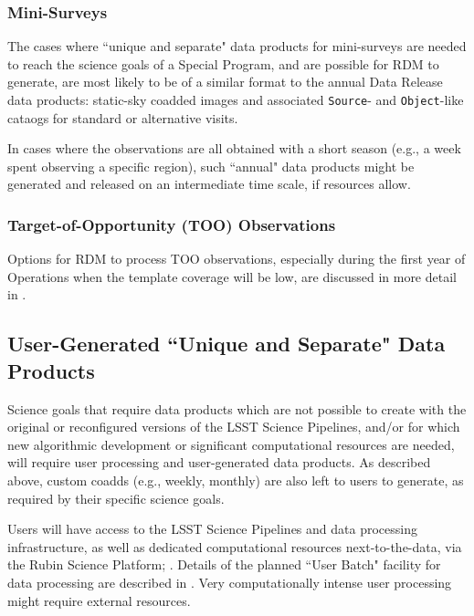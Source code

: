 \subsubsection{Mini-Surveys}

The cases where ``unique and separate" data products for mini-surveys are 
needed to reach the science goals of a Special Program, and are possible for 
RDM to generate, are most likely to be of a similar format to the annual 
Data Release data products: static-sky coadded images and associated 
{\tt Source}- and {\tt Object}-like cataogs for standard or alternative visits.

In cases where the observations are all obtained with a short season 
(e.g., a week spent observing a specific region), such ``annual" 
data products might be generated and released on an intermediate time scale, 
if resources allow.


\subsubsection{Target-of-Opportunity (TOO) Observations}

Options for RDM to process TOO observations, especially during the first year of Operations 
when the template coverage will be low, are discussed in more detail in 
.


\subsection{User-Generated ``Unique and Separate" Data Products}\label{ssec:proc_user}

Science goals that require data products which are not possible to create with 
the original or reconfigured versions of the LSST Science Pipelines, 
and/or for which new algorithmic development or significant computational resources 
are needed, will require user processing and user-generated data products.
As described above, custom coadds (e.g., weekly, monthly) are also left to users 
to generate, as required by their specific science goals.

Users will have access to the LSST Science Pipelines and data processing 
infrastructure, as well as dedicated computational resources next-to-the-data, 
via the Rubin Science Platform; .
Details of the planned ``User Batch" facility for data processing are described in 
.
Very computationally intense user processing might require external resources. 

